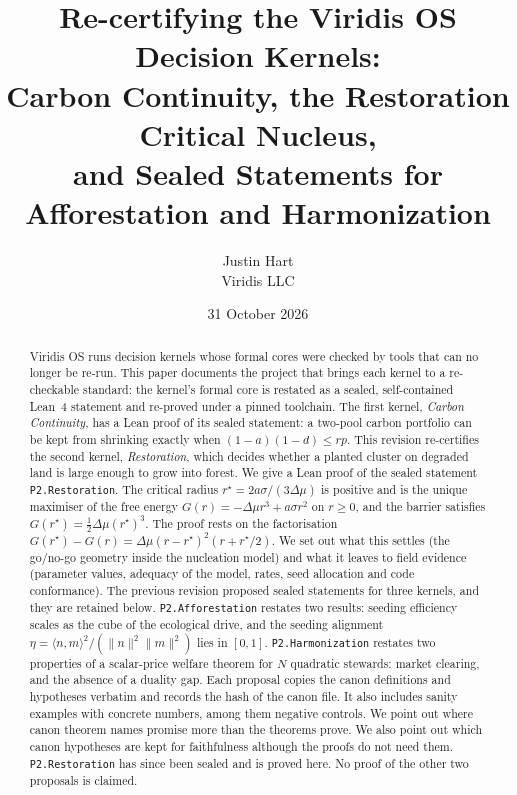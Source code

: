 \documentclass[11pt]{article}
\title{Re-certifying the Viridis OS Decision Kernels:\\ Carbon Continuity, the Restoration Critical Nucleus,\\ and Sealed Statements for Afforestation and Harmonization}
\author{Justin Hart\\ Viridis LLC}
\date{31 October 2026}
\theoremstyle{definition}
\theoremstyle{remark}
\begin{document}
\maketitle

\begin{abstract}
Viridis OS runs decision kernels whose formal cores were checked by tools that can no longer be re-run.
This paper documents the project that brings each kernel to a re-checkable standard: the kernel's formal core is restated as a
sealed, self-contained Lean~4 statement and re-proved under a pinned toolchain.
The first kernel, \emph{Carbon Continuity}, has a Lean proof of its sealed statement: a two-pool carbon portfolio can be kept
from shrinking exactly when $(1-a)(1-d)\le rp$.
This revision re-certifies the second kernel, \emph{Restoration}, which decides whether a planted cluster on degraded
land is large enough to grow into forest.
We give a Lean proof of the sealed statement \texttt{P2.Restoration}.
The critical radius $r^\star=2a\sigma/(3\Delta\mu)$ is positive and is the unique maximiser of the free energy
$G(r)=-\Delta\mu r^3+a\sigma r^2$ on $r\ge 0$, and the barrier satisfies $G(r^\star)=\tfrac12\Delta\mu (r^\star)^3$.
The proof rests on the factorisation $G(r^\star)-G(r)=\Delta\mu(r-r^\star)^2(r+r^\star/2)$.
We set out what this settles (the go/no-go geometry inside the nucleation model) and what it leaves to field
evidence (parameter values, adequacy of the model, rates, seed allocation and code conformance).
The previous revision proposed sealed statements for three kernels, and they are retained below.
\texttt{P2.Afforestation} restates two results: seeding efficiency scales as the cube of the ecological drive, and the seeding
alignment $\eta=\langle n,m\rangle^2/(\|n\|^2\|m\|^2)$ lies in $[0,1]$.
\texttt{P2.Harmonization} restates two properties of a scalar-price welfare theorem for $N$ quadratic stewards: market clearing,
and the absence of a duality gap.
Each proposal copies the canon definitions and hypotheses verbatim and records the hash of the canon file.
It also includes sanity examples with concrete numbers, among them negative controls.
We point out where canon theorem names promise more than the theorems prove.
We also point out which canon hypotheses are kept for faithfulness although the proofs do not need them.
\texttt{P2.Restoration} has since been sealed and is proved here. No proof of the other two proposals is claimed.
\end{abstract}
\end{document}
